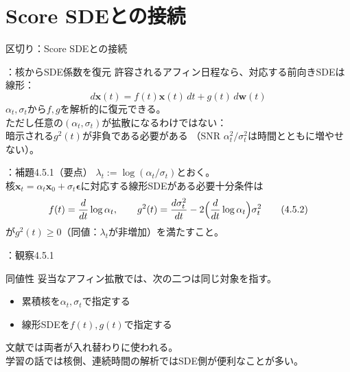 \section{Score SDEとの接続}
\assuppl
\begin{frame}{区切り：\supplmark\;Score SDEとの接続}
    \tableofcontents[currentsection]
\end{frame}
\assuppl
\begin{frame}{\supplmark：核からSDE係数を復元}
    許容されるアフィン日程なら、対応する前向きSDEは線形：
    \[
        d\bm{x}(t)=f(t)\bm{x}(t)\,dt+g(t)\,d\bm{w}(t)
    \]
    $\alpha_t,\sigma_t$から$f,g$を解析的に復元できる。\\
    ただし任意の$(\alpha_t,\sigma_t)$が拡散になるわけではない：\\
    暗示される$g^{2}(t)$が非負である必要がある
    （SNR $\alpha_t^{2}/\sigma_t^{2}$は時間とともに増やせない）。
\end{frame}
\assuppl
\begin{frame}{\supplmark：補題4.5.1（要点）}
    $\lambda_t:=\log(\alpha_t/\sigma_t)$とおく。\\
    核$\bm{x}_t=\alpha_t\bm{x}_0+\sigma_t\bm{\epsilon}$に対応する線形SDEがある必要十分条件は
    \[
        f(t)=\dfrac{d}{dt}\log\alpha_t,
        \qquad
        g^{2}(t)
        =
        \dfrac{d\sigma_t^{2}}{dt}
        -2\Bigl(\dfrac{d}{dt}\log\alpha_t\Bigr)\sigma_t^{2}
        \tag{4.5.2}
    \]
    が$g^{2}(t)\ge 0$（同値：$\lambda_t$が非増加）を満たすこと。
\end{frame}
\assuppl
\begin{frame}{\supplmark：観察4.5.1}
    \begin{exampleblock}{同値性}
        妥当なアフィン拡散では、次の二つは同じ対象を指す。
        \begin{itemize}
            \item 累積核を$\alpha_t,\sigma_t$で指定する
            \item 線形SDEを$f(t),g(t)$で指定する
        \end{itemize}
    \end{exampleblock}
    文献では両者が入れ替わりに使われる。\\
    学習の話では核側、連続時間の解析ではSDE側が便利なことが多い。
\end{frame}
